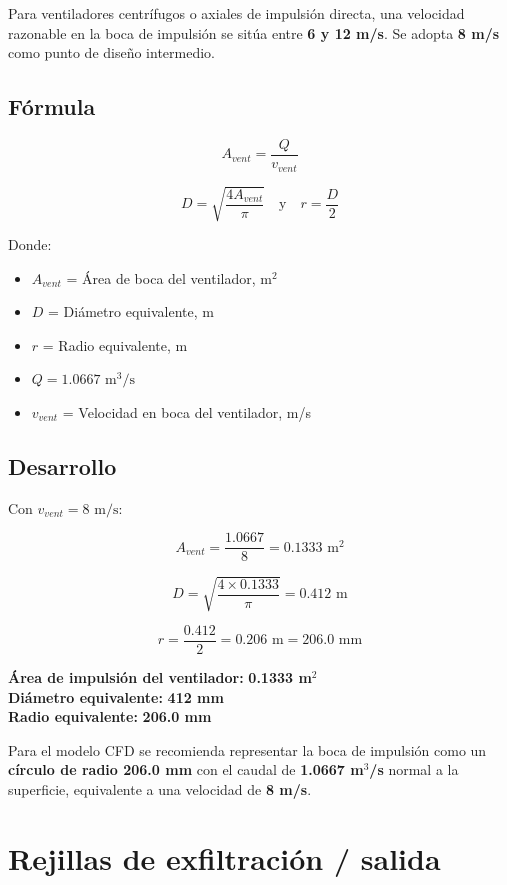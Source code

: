 \documentclass[12pt,a4paper]{article}
\begin{document}
Para ventiladores centrífugos o axiales de impulsión directa, una velocidad razonable en la boca de impulsión se sitúa entre \textbf{6 y 12 m/s}. Se adopta \textbf{8 m/s} como punto de diseño intermedio.

\subsection{Fórmula}

\[
A_{vent} = \frac{Q}{v_{vent}}
\]

\[
D = \sqrt{\frac{4 A_{vent}}{\pi}}
\quad \text{y} \quad
r = \frac{D}{2}
\]

Donde:
\begin{itemize}[leftmargin=*]
    \item $A_{vent}$ = Área de boca del ventilador, m$^2$
    \item $D$ = Diámetro equivalente, m
    \item $r$ = Radio equivalente, m
    \item $Q = 1.0667 \text{ m}^3/\text{s}$
    \item $v_{vent}$ = Velocidad en boca del ventilador, m/s
\end{itemize}

\subsection{Desarrollo}

Con $v_{vent} = 8 \text{ m/s}$:

\[
A_{vent} = \frac{1.0667}{8} = 0.1333 \text{ m}^2
\]

\[
D = \sqrt{\frac{4 \times 0.1333}{\pi}} = 0.412 \text{ m}
\]

\[
r = \frac{0.412}{2} = 0.206 \text{ m} = 206.0 \text{ mm}
\]

\textbf{Área de impulsión del ventilador:} \textbf{0.1333 m$^2$}\\
\textbf{Diámetro equivalente:} \textbf{412 mm}\\
\textbf{Radio equivalente:} \textbf{206.0 mm}

Para el modelo CFD se recomienda representar la boca de impulsión como un \textbf{círculo de radio 206.0 mm} con el caudal de \textbf{1.0667 m$^3$/s} normal a la superficie, equivalente a una velocidad de \textbf{8 m/s}.

\section{Rejillas de exfiltración / salida}
\end{document}
